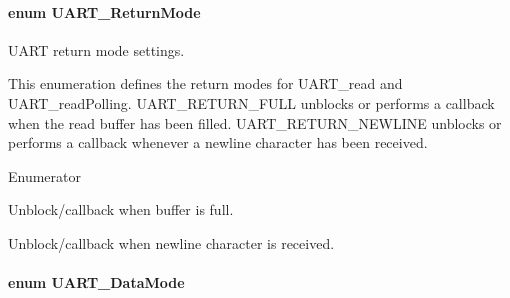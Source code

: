 \paragraph[{U\-A\-R\-T\-\_\-\-Return\-Mode}]{\setlength{\rightskip}{0pt plus 5cm}enum {\bf U\-A\-R\-T\-\_\-\-Return\-Mode}}\label{_u_a_r_t_8h_acb5a82843435a1b5d51b6c27028d914f}


U\-A\-R\-T return mode settings. 

This enumeration defines the return modes for U\-A\-R\-T\-\_\-read and U\-A\-R\-T\-\_\-read\-Polling. U\-A\-R\-T\-\_\-\-R\-E\-T\-U\-R\-N\-\_\-\-F\-U\-L\-L unblocks or performs a callback when the read buffer has been filled. U\-A\-R\-T\-\_\-\-R\-E\-T\-U\-R\-N\-\_\-\-N\-E\-W\-L\-I\-N\-E unblocks or performs a callback whenever a newline character has been received. \begin{Desc}
\item[Enumerator]\par
\begin{description}
\item[{\em 
U\-A\-R\-T\-\_\-\-R\-E\-T\-U\-R\-N\-\_\-\-F\-U\-L\-L\label{_u_a_r_t_8h_acb5a82843435a1b5d51b6c27028d914fa50c07cbaf7518a0acd14137e801687e5}
}]Unblock/callback when buffer is full. \item[{\em 
U\-A\-R\-T\-\_\-\-R\-E\-T\-U\-R\-N\-\_\-\-N\-E\-W\-L\-I\-N\-E\label{_u_a_r_t_8h_acb5a82843435a1b5d51b6c27028d914fa3b8e419e0e12abf80b25f72d17745f76}
}]Unblock/callback when newline character is received. \end{description}
\end{Desc}
\paragraph[{U\-A\-R\-T\-\_\-\-Data\-Mode}]{\setlength{\rightskip}{0pt plus 5cm}enum {\bf U\-A\-R\-T\-\_\-\-Data\-Mode}}\label{_u_a_r_t_8h_a694090fdb166f94ac30b809f9cba87b8}



